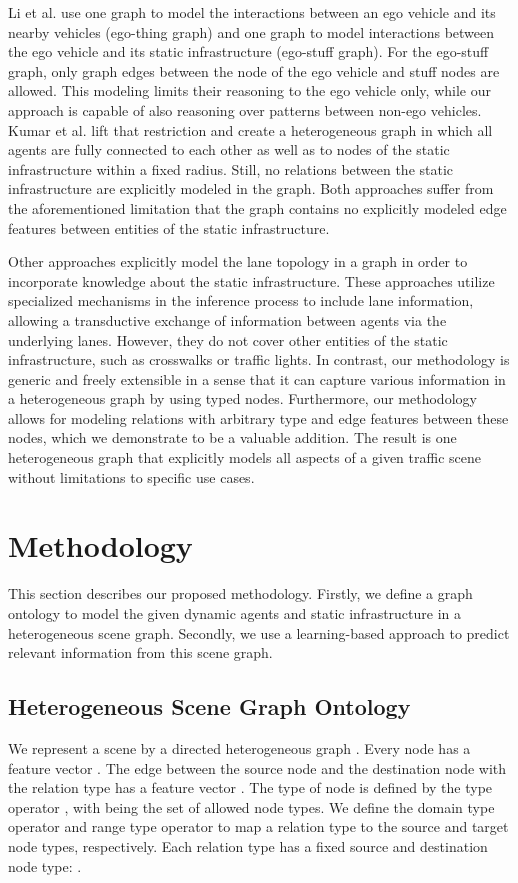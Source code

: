 \documentclass[letterpaper, 10 pt, journal, twoside]{IEEEtran}
\begin{document}
Li et al. \cite{Li2020a} use one graph to model the interactions between an ego vehicle and its nearby vehicles (ego-thing graph) and one graph to model interactions between the ego vehicle and its static infrastructure (ego-stuff graph).
For the ego-stuff graph, only graph edges between the node of the ego vehicle and stuff nodes are allowed.
This modeling limits their reasoning to the ego vehicle only, while our approach is capable of also reasoning over patterns between non-ego vehicles.
Kumar et al. \cite{Kumar2021} lift that restriction and create a heterogeneous graph in which all agents are fully connected to each other as well as to nodes of the static infrastructure within a fixed radius.
Still, no relations between the static infrastructure are explicitly modeled in the graph.
Both approaches suffer from the aforementioned limitation that the graph contains no explicitly modeled edge features between entities of the static infrastructure.

Other approaches \cite{Liang2020, Zeng2021, Khandelwal2020_ARXIV} explicitly model the lane topology in a graph in order to incorporate knowledge about the static infrastructure.
These approaches utilize specialized mechanisms in the inference process to include lane information, allowing a transductive exchange of information between agents via the underlying lanes.
However, they do not cover other entities of the static infrastructure, such as crosswalks or traffic lights.
In contrast, our methodology is generic and freely extensible in a sense that it can capture various information in a heterogeneous graph by using typed nodes.
Furthermore, our methodology allows for modeling relations with arbitrary type and edge features between these nodes, which we demonstrate to be a valuable addition.
The result is one heterogeneous graph that explicitly models all aspects of a given traffic scene without limitations to specific use cases.


\section{Methodology}
This section describes our proposed methodology.
Firstly, we define a graph ontology to model the given dynamic agents and static infrastructure in a heterogeneous scene graph.
Secondly, we use a learning-based approach to predict relevant information from this scene graph.

\subsection{Heterogeneous Scene Graph Ontology}
We represent a scene by a directed heterogeneous graph .
Every node  has a feature vector .
The edge  between the source node  and the destination node  with the relation type  has a feature vector .
The type of node  is defined by the type operator , with  being the set of allowed node types.
We define the domain type operator  and range type operator  to map a relation type  to the source and target node types, respectively.
Each relation type  has a fixed source and destination node type: .
\end{document}
